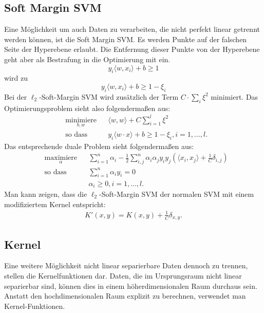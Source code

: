 \documentclass[ngerman]{scrartcl}
\begin{document}
\subsection{Soft Margin SVM}
Eine Möglichkeit um auch Daten zu verarbeiten, die nicht perfekt linear getrennt werden können, ist die Soft Margin SVM.
Es werden Punkte auf der falschen Seite der Hyperebene erlaubt.
Die Entfernung dieser Punkte von der Hyperebene geht aber als Bestrafung in die Optimierung mit ein.
\begin{equation}
y_i \langle w,x_i\rangle + b \geq 1
\end{equation}
wird zu
\begin{equation}
y_i \langle w,x_i\rangle + b \geq 1 - \xi_i
\end{equation}
Bei der $\ell_2$-Soft-Margin SVM wird zusätzlich der Term $C \cdot \sum_i \xi^2$ minimiert. Das Optimierungsproblem sieht also folgendermaßen aus:
\begin{align}
&\underset{b,w}{\text{minimiere}} &&\langle w,w \rangle + C \sum_{i=1}^l \xi^2\\
&\text{so dass } && y_i \langle w \cdot x \rangle + b \geq 1 - \xi_i , i = 1, \ldots , l. \nonumber
\end{align}
Das entsprechende duale Problem sieht folgendermaßen aus:
\begin{align}
&\underset{\alpha}{\text{maximiere}} && \sum_{i=1}^n \alpha_i - \frac{1}{2} \sum_{i,j}^n \alpha_i \alpha_j y_i y_j \left( \langle x_i, x_j \rangle + \frac{1}{C} \delta_{i,j}\right)  \\
&\text{so dass } && \sum_{i=1}^n \alpha_i y_i = 0 \\
&&&  \alpha_i \geq 0, i = 1, \ldots  ,l.
\end{align}
Man kann zeigen, dass die $\ell_2$-Soft-Margin SVM der normalen SVM mit einem modifiziertem Kernel entspricht:
\begin{align}
K'(x,y) = K(x,y) + \frac{1}{C} \delta_{x,y}.
\end{align}

\subsection{Kernel}
Eine weitere Möglichkeit nicht linear separierbare Daten dennoch zu trennen, stellen die Kernelfunktionen dar.
Daten, die im Ursprungsraum nicht linear separierbar sind, können dies in einem höherdimensionalen Raum durchaus sein. 
Anstatt den hochdimensionalen Raum explizit zu berechnen, verwendet man Kernel-Funktionen.
 
\end{document}
